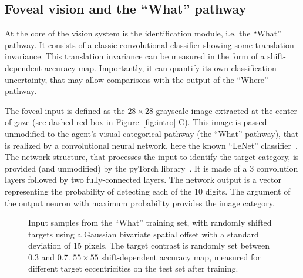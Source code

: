 \subsection*{Foveal vision and the ``What'' pathway}
%


At the core of the vision system is the identification module, i.e. the ``What'' pathway. It consists of a classic convolutional classifier showing some translation invariance. This translation invariance can be measured in the form of a shift-dependent accuracy map. Importantly, it can quantify its own classification uncertainty, that may allow comparisons with the output of the ``Where'' pathway.

The foveal input is defined as the $28\times 28$ grayscale image extracted at the center of gaze (see dashed red box in Figure~\ref{fig:intro}-C). 
This image is passed unmodified to the agent's visual categorical pathway (the ``What'' pathway), that is realized by a convolutional neural network, here  the known ``LeNet'' classifier~\cite{Lecun1998}. The network structure, that processes the input to identify the target category, is  provided (and unmodified) by the pyTorch library~\cite{Paszke17}.
It is made of a 3 convolution layers followed by two fully-connected layers.
The network output is a vector representing the probability of detecting each of the $10$ digits. The argument of the output neuron with maximum probability provides the image category. 

\begin{figure}[t!]%
	\caption{\A Input samples from the ``What'' training set, with  randomly shifted targets using a Gaussian bivariate spatial offset with a standard deviation of 15 pixels. The target contrast is randomly set between 0.3 and 0.7.
	\B $55 \times 55$ shift-dependent accuracy map, measured for different target eccentricities on the test set after training.  
	}
\label{fig:accuracy}
\end{figure}

